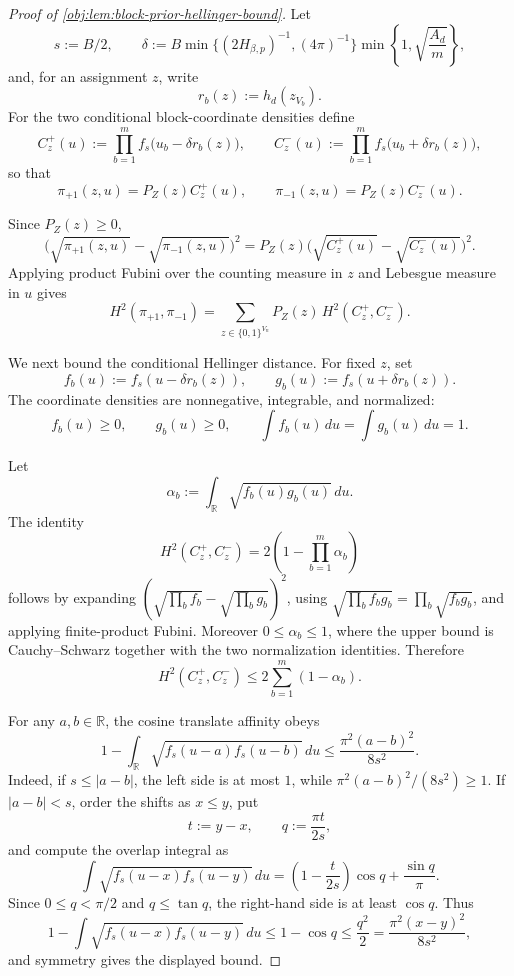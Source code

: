 \begin{proof}[Proof of \cref{obj:lem:block-prior-hellinger-bound}]
Let
\[
s:=B/2,
\qquad
\delta:=B\min\{(2H_{\beta,p})^{-1},(4\pi)^{-1}\}
  \min\left\{1,\sqrt{\frac{A_d}{m}}\right\},
\]
and, for an assignment \(z\), write
\[
r_b(z):=h_d(z_{V_b}) .
\]
For the two conditional block-coordinate densities define
\[
C_z^+(u):=\prod_{b=1}^{m} f_s\bigl(u_b-\delta r_b(z)\bigr),
\qquad
C_z^-(u):=\prod_{b=1}^{m} f_s\bigl(u_b+\delta r_b(z)\bigr),
\]
so that
\[
\pi_{+1}(z,u)=P_Z(z)C_z^+(u),
\qquad
\pi_{-1}(z,u)=P_Z(z)C_z^-(u).
\]

Since \(P_Z(z)\ge0\),
\[
\bigl(\sqrt{\pi_{+1}(z,u)}-\sqrt{\pi_{-1}(z,u)}\bigr)^2
=
P_Z(z)\bigl(\sqrt{C_z^+(u)}-\sqrt{C_z^-(u)}\bigr)^2 .
\]
Applying product Fubini over the counting measure in \(z\) and Lebesgue measure in \(u\) gives
\[
H^2(\pi_{+1},\pi_{-1})
=
\sum_{z\in\{0,1\}^{V_n}}
P_Z(z)\,
H^2(C_z^+,C_z^-).
\]

We next bound the conditional Hellinger distance.  For fixed \(z\), set
\[
f_b(u):=f_s(u-\delta r_b(z)),
\qquad
g_b(u):=f_s(u+\delta r_b(z)).
\]
The coordinate densities are nonnegative, integrable, and normalized:
\[
f_b(u)\ge0,\qquad g_b(u)\ge0,\qquad
\int f_b(u)\,du=\int g_b(u)\,du=1 .
\]

Let
\[
\alpha_b:=\int_{\mathbb R}\sqrt{f_b(u)g_b(u)}\,du .
\]
The identity
\[
H^2(C_z^+,C_z^-)
=
2\left(1-\prod_{b=1}^{m}\alpha_b\right)
\]
follows by expanding
\((\sqrt{\prod_b f_b}-\sqrt{\prod_b g_b})^2\), using
\(\sqrt{\prod_b f_b g_b}=\prod_b\sqrt{f_b g_b}\), and applying finite-product Fubini.  Moreover \(0\le\alpha_b\le1\), where the upper bound is Cauchy--Schwarz together with the two normalization identities.  Therefore
\[
H^2(C_z^+,C_z^-)
\le
2\sum_{b=1}^{m}(1-\alpha_b).
\]

For any \(a,b\in\mathbb R\), the cosine translate affinity obeys
\[
1-\int_{\mathbb R}\sqrt{f_s(u-a)f_s(u-b)}\,du
\le
\frac{\pi^2(a-b)^2}{8s^2}.
\]
Indeed, if \(s\le |a-b|\), the left side is at most \(1\), while
\(\pi^2(a-b)^2/(8s^2)\ge1\).  If \(|a-b|<s\), order the shifts as \(x\le y\), put
\[
t:=y-x,
\qquad
q:=\frac{\pi t}{2s},
\]
and compute the overlap integral as
\[
\int\sqrt{f_s(u-x)f_s(u-y)}\,du
=
\left(1-\frac{t}{2s}\right)\cos q+\frac{\sin q}{\pi}.
\]
Since \(0\le q<\pi/2\) and \(q\le\tan q\), the right-hand side is at least \(\cos q\).  Thus
\[
1-\int\sqrt{f_s(u-x)f_s(u-y)}\,du
\le
1-\cos q
\le
\frac{q^2}{2}
=
\frac{\pi^2(x-y)^2}{8s^2},
\]
and symmetry gives the displayed bound. %


\end{proof}
